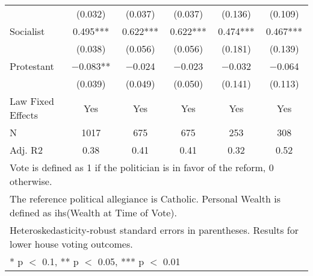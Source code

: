 \begin{table}[!h]
{\begin{tabular}[t]{lccccc}
 & (\num{0.032}) & (\num{0.037}) & (\num{0.037}) & (\num{0.136}) & (\num{0.109})\\
Socialist & \num{0.495}*** & \num{0.622}*** & \num{0.622}*** & \num{0.474}*** & \num{0.467}***\\
 & (\num{0.038}) & (\num{0.056}) & (\num{0.056}) & (\num{0.181}) & (\num{0.139})\\
Protestant & \num{-0.083}** & \num{-0.024} & \num{-0.023} & \num{-0.032} & \num{-0.064}\\
 & (\num{0.039}) & (\num{0.049}) & (\num{0.050}) & (\num{0.141}) & (\num{0.113})\\
\midrule
Law Fixed Effects & Yes & Yes & Yes & Yes & Yes\\
N & \num{1017} & \num{675} & \num{675} & \num{253} & \num{308}\\
Adj. R2 & \num{0.38} & \num{0.41} & \num{0.41} & \num{0.32} & \num{0.52}\\
\bottomrule
\multicolumn{6}{l}{\rule{0pt}{1em}Vote is defined as 1 if the politician is in favor of the reform, 0 otherwise.}\\
\multicolumn{6}{l}{\rule{0pt}{1em}The reference political allegiance is Catholic. Personal Wealth is defined as ihs(Wealth at Time of Vote).}\\
\multicolumn{6}{l}{\rule{0pt}{1em}Heteroskedasticity-robust standard errors in parentheses. Results for lower house voting outcomes.}\\
\multicolumn{6}{l}{\rule{0pt}{1em}* p $<$ 0.1, ** p $<$ 0.05, *** p $<$ 0.01}\\
\end{tabular}}
\end{table}
